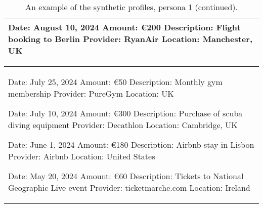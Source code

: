 \begin{table*}[!ht]
\begin{tabular}{p{}}
            Date: August 10, 2024 \newline
            Amount: €200 \newline
            Description: Flight booking to Berlin \newline
            Provider: RyanAir  \newline
            Location: Manchester, UK \newline
\\
   
    \bottomrule         
    \end{tabular}
    \caption{An example of the synthetic profiles, persona 1 (continued).}
    \label{tab:profile3}
\end{table*}

\begin{table*}[!ht]
    \centering
    \begin{tabular}{p{}}
    \toprule
     
            Date: July 25, 2024 \newline
            Amount: €50 \newline
            Description: Monthly gym membership \newline
            Provider: PureGym \newline
            Location: UK \newline

            Date: July 10, 2024  \newline
            Amount: €300  \newline
            Description: Purchase of scuba diving equipment  \newline
            Provider: Decathlon  \newline
            Location: Cambridge, UK  \newline

            Date: June 1, 2024  \newline
            Amount: €180  \newline
            Description: Airbnb stay in Lisbon  \newline
            Provider: Airbnb  \newline
            Location: United States  \newline

            Date: May 20, 2024  \newline
            Amount: €60  \newline
            Description: Tickets to National Geographic Live event  \newline
            Provider: ticketmarche.com  \newline
            Location: Ireland  \newline


\end{tabular}
\end{table*}
